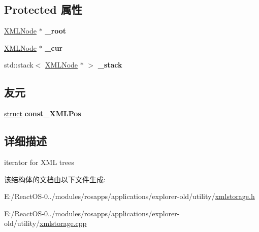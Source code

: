 \subsection*{Protected 属性}
\begin{DoxyCompactItemize}
\item 
\mbox{\label{struct_x_m_l_storage_1_1_x_m_l_pos_a6740a5282f846d046842cf250f8aed51}} 
\hyperlink{struct_x_m_l_storage_1_1_x_m_l_node}{X\+M\+L\+Node} $\ast$ {\bfseries \+\_\+root}
\item 
\mbox{\label{struct_x_m_l_storage_1_1_x_m_l_pos_a71e623f9b25c9c6abcdb599aa1ea109a}} 
\hyperlink{struct_x_m_l_storage_1_1_x_m_l_node}{X\+M\+L\+Node} $\ast$ {\bfseries \+\_\+cur}
\item 
\mbox{\label{struct_x_m_l_storage_1_1_x_m_l_pos_a0fb339169cc7ccb72165daf75d840b45}} 
std\+::stack$<$ \hyperlink{struct_x_m_l_storage_1_1_x_m_l_node}{X\+M\+L\+Node} $\ast$ $>$ {\bfseries \+\_\+stack}
\end{DoxyCompactItemize}
\subsection*{友元}
\begin{DoxyCompactItemize}
\item 
\mbox{\label{struct_x_m_l_storage_1_1_x_m_l_pos_a361c4bfff0f29eecbf7e792404a3da79}} 
\hyperlink{interfacestruct}{struct} {\bfseries const\+\_\+\+X\+M\+L\+Pos}
\end{DoxyCompactItemize}


\subsection{详细描述}
iterator for X\+ML trees 

该结构体的文档由以下文件生成\+:\begin{DoxyCompactItemize}
\item 
E\+:/\+React\+O\+S-\/0../modules/rosapps/applications/explorer-\/old/utility/\hyperlink{xmlstorage_8h}{xmlstorage.\+h}\item 
E\+:/\+React\+O\+S-\/0../modules/rosapps/applications/explorer-\/old/utility/\hyperlink{xmlstorage_8cpp}{xmlstorage.\+cpp}\end{DoxyCompactItemize}
